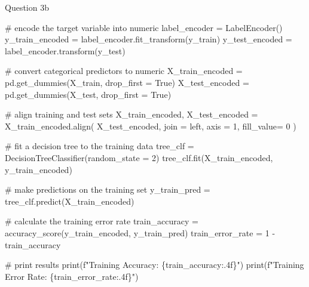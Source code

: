 \documentclass[
  letterpaper,
  DIV=11,
  numbers=noendperiod]{scrartcl}
\newenvironment{Shaded}{\begin{snugshade}}{\end{snugshade}}
\newcommand{\BuiltInTok}[1]{\textcolor[rgb]{0.00,0.23,0.31}{#1}}
\newcommand{\CommentTok}[1]{\textcolor[rgb]{0.37,0.37,0.37}{#1}}
\newcommand{\DecValTok}[1]{\textcolor[rgb]{0.68,0.00,0.00}{#1}}
\newcommand{\NormalTok}[1]{\textcolor[rgb]{0.00,0.23,0.31}{#1}}
\newcommand{\OperatorTok}[1]{\textcolor[rgb]{0.37,0.37,0.37}{#1}}
\newcommand{\SpecialCharTok}[1]{\textcolor[rgb]{0.37,0.37,0.37}{#1}}
\newcommand{\SpecialStringTok}[1]{\textcolor[rgb]{0.13,0.47,0.30}{#1}}
\newcommand{\StringTok}[1]{\textcolor[rgb]{0.13,0.47,0.30}{#1}}
\newcommand{\VariableTok}[1]{\textcolor[rgb]{0.07,0.07,0.07}{#1}}
\begin{document}
Question 3b

\begin{Shaded}
\begin{Highlighting}[]
\CommentTok{\# encode the target variable into numeric }
\NormalTok{label\_encoder }\OperatorTok{=}\NormalTok{ LabelEncoder()}
\NormalTok{y\_train\_encoded }\OperatorTok{=}\NormalTok{ label\_encoder.fit\_transform(y\_train)}
\NormalTok{y\_test\_encoded }\OperatorTok{=}\NormalTok{ label\_encoder.transform(y\_test) }

\CommentTok{\# convert categorical predictors to numeric }
\NormalTok{X\_train\_encoded }\OperatorTok{=}\NormalTok{ pd.get\_dummies(X\_train, drop\_first }\OperatorTok{=} \VariableTok{True}\NormalTok{)}
\NormalTok{X\_test\_encoded }\OperatorTok{=}\NormalTok{ pd.get\_dummies(X\_test, drop\_first }\OperatorTok{=} \VariableTok{True}\NormalTok{)}

\CommentTok{\# align training and test sets }
\NormalTok{X\_train\_encoded, X\_test\_encoded }\OperatorTok{=}\NormalTok{ X\_train\_encoded.align(}
\NormalTok{    X\_test\_encoded, join }\OperatorTok{=} \StringTok{\textquotesingle{}left\textquotesingle{}}\NormalTok{, axis }\OperatorTok{=} \DecValTok{1}\NormalTok{, fill\_value}\OperatorTok{=} \DecValTok{0} 
\NormalTok{)}

\CommentTok{\# fit a decision tree to the training data}
\NormalTok{tree\_clf }\OperatorTok{=}\NormalTok{ DecisionTreeClassifier(random\_state }\OperatorTok{=} \DecValTok{2}\NormalTok{)}
\NormalTok{tree\_clf.fit(X\_train\_encoded, y\_train\_encoded)}

\CommentTok{\# make predictions on the training set}
\NormalTok{y\_train\_pred }\OperatorTok{=}\NormalTok{ tree\_clf.predict(X\_train\_encoded)}

\CommentTok{\# calculate the training error rate}
\NormalTok{train\_accuracy }\OperatorTok{=}\NormalTok{ accuracy\_score(y\_train\_encoded, y\_train\_pred)}
\NormalTok{train\_error\_rate }\OperatorTok{=} \DecValTok{1} \OperatorTok{{-}}\NormalTok{ train\_accuracy}

\CommentTok{\# print results}
\BuiltInTok{print}\NormalTok{(}\SpecialStringTok{f"Training Accuracy: }\SpecialCharTok{\{}\NormalTok{train\_accuracy}\SpecialCharTok{:.4f\}}\SpecialStringTok{"}\NormalTok{)}
\BuiltInTok{print}\NormalTok{(}\SpecialStringTok{f"Training Error Rate: }\SpecialCharTok{\{}\NormalTok{train\_error\_rate}\SpecialCharTok{:.4f\}}\SpecialStringTok{"}\NormalTok{)}
\end{Highlighting}
\end{Shaded}
\end{document}
